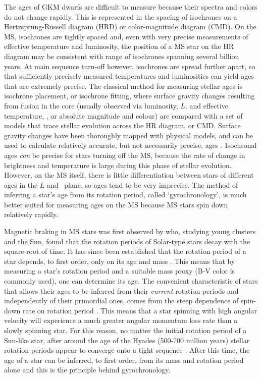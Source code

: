 The ages of GKM dwarfs are difficult to measure because their spectra and
colors do not change rapidly.
This is represented in the spacing of isochrones on a Hertzsprung-Russell
diagram (HRD) or color-magnitude diagram (CMD).
On the MS, isochrones are tightly spaced and, even with very precise
measurements of effective temperature and luminosity, the position of a MS
star on the HR diagram may be consistent with range of isochrones spanning
several billion years.
At main sequence turn-off however, isochrones are spread further apart, so
that sufficiently precisely measured temperatures and luminosities can yield
ages that are extremely precise.
The classical method for measuring stellar ages is isochrone placement, or
isochrone fitting, where surface gravity changes resulting from fusion in the
core (usually observed via luminosity, $L$, and effective temperature, \teff,
or absolute magnitude and colour) are compared with a set of models that trace
stellar evolution across the HR diagram, or CMD.
Surface gravity changes have been thoroughly mapped with physical models, and
can be used to calculate relatively accurate, but not necessarily precise,
ages \citep[barring some small, $\sim$10\% variations between different
models, \eg][]{yi2001, dotter2008, dotter2016}.
Isochronal ages {\it can} be precise for stars turning off the MS, because the
rate of change in brightness and temperature is large during this phase of
stellar evolution.
However, on the MS itself, there is little differentiation between stars of
different ages in the $L$ and \teff\ plane, so ages tend to be very imprecise.
The method of inferring a star's age from its rotation period, called
`gyrochronology', is much better suited for measuring ages on the MS because
MS stars spin down relatively rapidly.

Magnetic braking in MS stars was first observed by \citet{skumanich1972} who,
studying young clusters and the Sun, found that the rotation periods of
Solar-type stars decay with the square-root of time.
It has since been established that the rotation period of a star depends, to
first order, only on its age and mass \citep[\eg][]{barnes2003}.
This means that by measuring a star's rotation period and a suitable mass
proxy (B-V color is commonly used), one can determine its age.
The convenient characteristic of stars that allows their ages to be inferred
from their {\it current} rotation periods and independently of their
primordial ones, comes from the steep dependence of spin-down rate on rotation
period \citep{kawaler1989}.
This means that a star spinning with high angular velocity will experience a
much greater angular momentum loss rate than a slowly spinning star.
For this reason, no matter the initial rotation period of a Sun-like star,
after around the age of the Hyades (500-700 million years) stellar rotation
periods appear to converge onto a tight sequence \citep{irwin2009}.
After this time, the age of a star can be inferred, to first order, from its
mass and rotation period alone and this is the principle behind gyrochronology.

